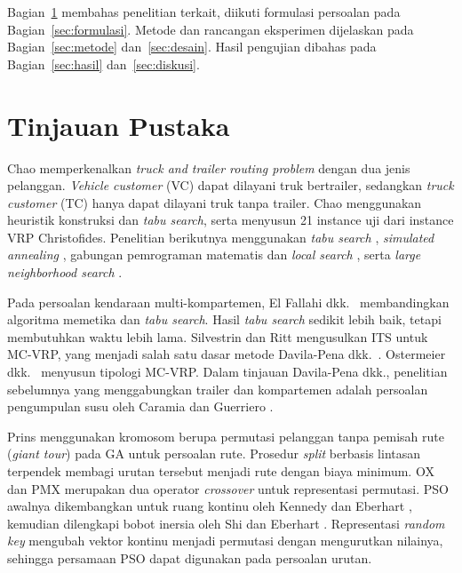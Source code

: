 \documentclass[conference]{IEEEtran}
\begin{document}
Bagian~\ref{sec:pustaka} membahas penelitian terkait, diikuti formulasi persoalan pada Bagian~\ref{sec:formulasi}. Metode dan rancangan eksperimen dijelaskan pada Bagian~\ref{sec:metode} dan~\ref{sec:desain}. Hasil pengujian dibahas pada Bagian~\ref{sec:hasil} dan~\ref{sec:diskusi}.

\section{Tinjauan Pustaka}\label{sec:pustaka}

Chao \cite{chao2002} memperkenalkan \textit{truck and trailer routing problem} dengan dua jenis pelanggan. \textit{Vehicle customer} (VC) dapat dilayani truk bertrailer, sedangkan \textit{truck customer} (TC) hanya dapat dilayani truk tanpa trailer. Chao menggunakan heuristik konstruksi dan \textit{tabu search}, serta menyusun 21 instance uji dari instance VRP Christofides. Penelitian berikutnya menggunakan \textit{tabu search} \cite{scheuerer2006}, \textit{simulated annealing} \cite{lin2009}, gabungan pemrograman matematis dan \textit{local search} \cite{caramia2010a}, serta \textit{large neighborhood search} \cite{derigs2013}.

Pada persoalan kendaraan multi-kompartemen, El Fallahi dkk.\ \cite{elfallahi2008} membandingkan algoritma memetika dan \textit{tabu search}. Hasil \textit{tabu search} sedikit lebih baik, tetapi membutuhkan waktu lebih lama. Silvestrin dan Ritt \cite{silvestrin2017} mengusulkan ITS untuk MC-VRP, yang menjadi salah satu dasar metode Davila-Pena dkk.\ \cite{davila2023}. Ostermeier dkk.\ \cite{ostermeier2021} menyusun tipologi MC-VRP. Dalam tinjauan Davila-Pena dkk., penelitian sebelumnya yang menggabungkan trailer dan kompartemen adalah persoalan pengumpulan susu oleh Caramia dan Guerriero \cite{caramia2010b}.

Prins \cite{prins2004} menggunakan kromosom berupa permutasi pelanggan tanpa pemisah rute (\textit{giant tour}) pada GA untuk persoalan rute. Prosedur \textit{split} berbasis lintasan terpendek membagi urutan tersebut menjadi rute dengan biaya minimum. OX \cite{davis1985} dan PMX \cite{goldberg1985} merupakan dua operator \textit{crossover} untuk representasi permutasi. PSO awalnya dikembangkan untuk ruang kontinu oleh Kennedy dan Eberhart \cite{kennedy1995}, kemudian dilengkapi bobot inersia oleh Shi dan Eberhart \cite{shi1998}. Representasi \textit{random key} \cite{bean1994} mengubah vektor kontinu menjadi permutasi dengan mengurutkan nilainya, sehingga persamaan PSO dapat digunakan pada persoalan urutan.
\end{document}
